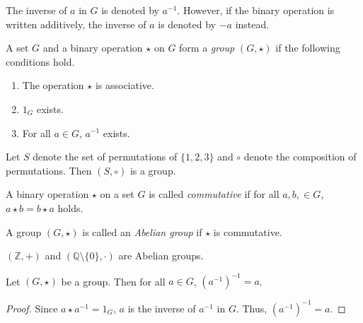 \begin{notation}
  The inverse of $a$ in $G$ is denoted by $a^{-1}$.
  However, if the binary operation is written additively, the inverse of $a$
  is denoted by $-a$ instead.
\end{notation}

\begin{definition}\label{def:group}
  A set $G$ and a binary operation $\star$ on $G$ form a \emph{group}
  $(G, \star)$ if the following conditions hold.
  \begin{enumerate}
    \item The operation $\star$ is associative.
    \item $1_G$ exists.
    \item For all $a \in G$, $a^{-1}$ exists.
  \end{enumerate}
\end{definition}

\begin{example}
  Let $S$ denote the set of permutations of $\{1, 2, 3\}$ and $\circ$
  denote the composition of permutations. Then $(S, \circ)$ is a group.
\end{example}

\begin{definition}\label{def:commutativity}
  A binary operation $\star$ on a set $G$ is called \emph{commutative} if
  for all $a, b, \in G$, $a \star b = b \star a$ holds.
\end{definition}

\begin{definition}\label{def:abelian-group}
  A group $(G, \star)$ is called an \emph{Abelian group} if $\star$ is
  commutative.
\end{definition}

\begin{example}
  $(\mathbb{Z}, +)$ and $(\mathbb{Q} \setminus \{0\}, \cdot)$ are Abelian
  groups.
\end{example}

\begin{theorem}\label{thm:inverse-inverse}
  Let $(G, \star)$ be a group. Then for all $a \in G$, $(a^{-1})^{-1} = a$.
\end{theorem}
\begin{proof}
  Since $a \star a^{-1} = 1_G$, $a$ is the inverse of $a^{-1}$ in $G$.
  Thus, $(a^{-1})^{-1} = a$.
\end{proof}

